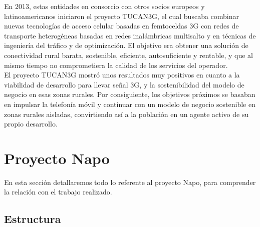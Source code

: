 En 2013, estas entidades en consorcio con otros socios europeos y latinoamericanos iniciaron el proyecto TUCAN3G, el cual buscaba combinar nuevas tecnologías de acceso celular basadas en femtoceldas 3G con redes de transporte heterogéneas basadas en redes inalámbricas multisalto y en técnicas de ingeniería del tráfico y de optimización. El objetivo era obtener una solución de conectividad rural barata, sostenible, eficiente, autosuficiente y rentable, y que al mismo tiempo no comprometiera la calidad de los servicios del operador.\\
	
El proyecto TUCAN3G mostró unos resultados muy positivos en cuanto a la viabilidad de desarrollo para llevar señal 3G, y la sostenibilidad del modelo de negocio en esas zonas rurales. Por consiguiente, los objetivos próximos se basaban en impulsar la telefonía móvil y continuar con un modelo de negocio sostenible en zonas rurales aisladas, convirtiendo así a la población en un agente activo de su propio desarrollo.    
	
\section{Proyecto Napo}
	En esta sección detallaremos todo lo referente al proyecto Napo, para comprender la relación con el trabajo realizado.
	
	\subsection{Estructura}
	
